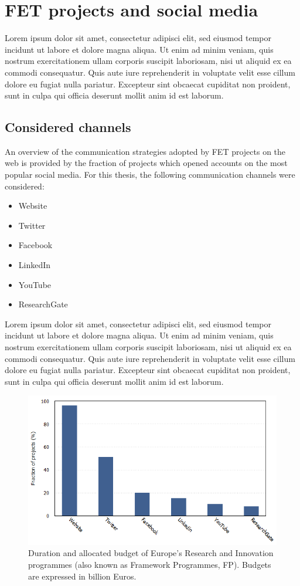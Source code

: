 \chapter{FET projects and social media}
Lorem ipsum dolor sit amet, consectetur adipisci elit, sed eiusmod tempor incidunt ut labore et dolore magna aliqua. Ut enim ad minim veniam, quis nostrum exercitationem ullam corporis suscipit laboriosam, nisi ut aliquid ex ea commodi consequatur. Quis aute iure reprehenderit in voluptate velit esse cillum dolore eu fugiat nulla pariatur. Excepteur sint obcaecat cupiditat non proident, sunt in culpa qui officia deserunt mollit anim id est laborum.

\section{Considered channels} 
An overview of the communication strategies adopted by FET projects on the web is provided by the fraction of projects which opened accounts on the most popular social media. For this thesis, the following communication channels were considered:

\begin{itemize}
 \item Website
 \item Twitter
 \item Facebook
 \item LinkedIn
 \item YouTube
 \item ResearchGate
\end{itemize}

Lorem ipsum dolor sit amet, consectetur adipisci elit, sed eiusmod tempor incidunt ut labore et dolore magna aliqua. Ut enim ad minim veniam, quis nostrum exercitationem ullam corporis suscipit laboriosam, nisi ut aliquid ex ea commodi consequatur. Quis aute iure reprehenderit in voluptate velit esse cillum dolore eu fugiat nulla pariatur. Excepteur sint obcaecat cupiditat non proident, sunt in culpa qui officia deserunt mollit anim id est laborum.

\begin{figure}[!t] 
 \begin{center}
 \includegraphics[scale=0.4]{Images/Social_media.png}
 \caption{Duration and allocated budget of Europe's Research and Innovation programmes (also known as Framework Programmes, FP). Budgets are expressed in billion Euros.}
 \label{FP_funds}
 \end{center}
\end{figure}